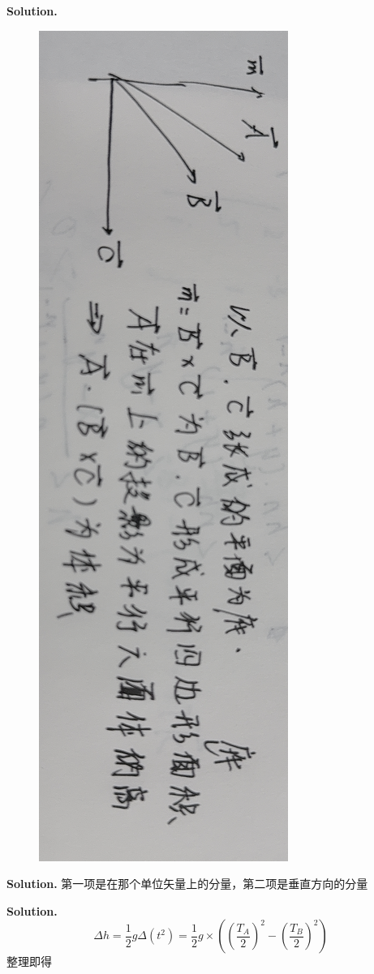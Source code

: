 \documentclass[12pt, a4paper, oneside]{ctexart}
\newenvironment{solution}{\par\noindent\textbf{Solution. }}{\par}
\begin{document}
	\begin{solution}
		\begin{figure}[h]
			\centering
			\includegraphics[scale = 0.09,angle=90]{3DBEE0976199DBEFBAC2BAE8C3F9E300.png}
		\end{figure}
	\end{solution}
	
	\begin{solution}
		第一项是在那个单位矢量上的分量，第二项是垂直方向的分量
	\end{solution}
	
	\begin{solution}
		$$ \Delta h = \dfrac{1}{2}g \Delta \left( t^2 \right) = \dfrac{1}{2}g \times \left( \left(\dfrac{T_A}{2} \right)^2 - \left(\dfrac{T_B}{2} \right)^2 \right) $$
		整理即得
	\end{solution}
\end{document}

